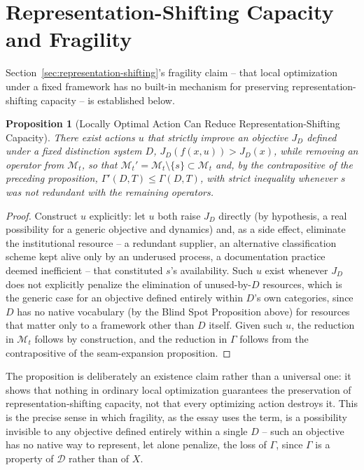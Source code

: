 \documentclass[11pt]{article}
\theoremstyle{plain}
\newtheorem{proposition}{Proposition}[section]
\begin{document}
\section{Representation-Shifting Capacity and Fragility}
\label{app:fragility}

\noindent Section~\ref{sec:representation-shifting}'s fragility claim -- that local optimization under a fixed framework has no built-in mechanism for preserving representation-shifting capacity -- is established below.

\begin{proposition}[Locally Optimal Action Can Reduce Representation-Shifting Capacity]
There exist actions $u$ that strictly improve an objective $J_D$ defined under a fixed distinction system $D$, $J_D(f(x,u)) > J_D(x)$, while removing an operator from $\mathcal{M}_t$, so that $\mathcal{M}_t' = \mathcal{M}_t \setminus \{s\} \subset \mathcal{M}_t$ and, by the contrapositive of the preceding proposition, $\Gamma'(D,T) \leq \Gamma(D,T)$, with strict inequality whenever $s$ was not redundant with the remaining operators.
\end{proposition}
\begin{proof}
Construct $u$ explicitly: let $u$ both raise $J_D$ directly (by hypothesis, a real possibility for a generic objective and dynamics) and, as a side effect, eliminate the institutional resource -- a redundant supplier, an alternative classification scheme kept alive only by an underused process, a documentation practice deemed inefficient -- that constituted $s$'s availability. Such $u$ exist whenever $J_D$ does not explicitly penalize the elimination of unused-by-$D$ resources, which is the generic case for an objective defined entirely within $D$'s own categories, since $D$ has no native vocabulary (by the Blind Spot Proposition above) for resources that matter only to a framework other than $D$ itself. Given such $u$, the reduction in $\mathcal{M}_t$ follows by construction, and the reduction in $\Gamma$ follows from the contrapositive of the seam-expansion proposition.
\end{proof}

\noindent The proposition is deliberately an existence claim rather than a universal one: it shows that nothing in ordinary local optimization guarantees the preservation of representation-shifting capacity, not that every optimizing action destroys it. This is the precise sense in which fragility, as the essay uses the term, is a possibility invisible to any objective defined entirely within a single $D$ -- such an objective has no native way to represent, let alone penalize, the loss of $\Gamma$, since $\Gamma$ is a property of $\mathcal{D}$ rather than of $X$.
\end{document}
